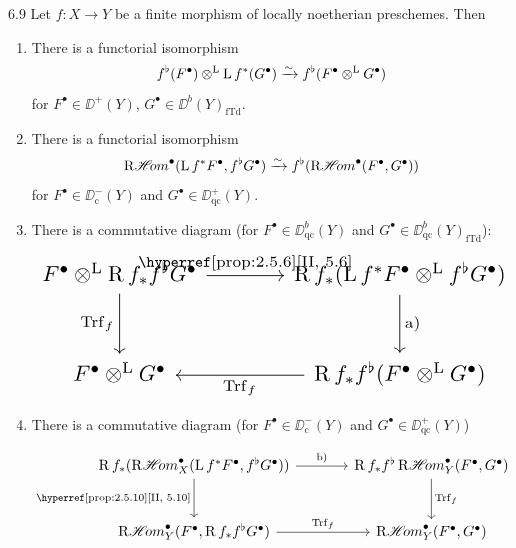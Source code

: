 \begin{bookproposition}{6.9}\label{prop:3.6.9}
Let $f\colon X\to Y$ be a finite morphism of locally noetherian preschemes. Then
\begin{enumerate}
\item[a)] There is a functorial isomorphism
\[
f^{\flat}(F^\bullet)\mathbin{\otimes^{\mathrm{L}}}\operatorname{L} f^*(G^\bullet) \xrightarrow{\sim} f^{\flat}(F^\bullet\mathbin{\otimes^{\mathrm{L}}} G^\bullet)
\]
for $F^\bullet\in\DD^+(Y)$, $G^\bullet\in\DD^b(Y)_{\mathrm{fTd}}$.
\item[b)] There is a functorial isomorphism
\[
\mathop{\mathrm{R}\mathscr{H}\!om}\nolimits^\bullet(\operatorname{L} f^*F^\bullet, f^{\flat}G^\bullet) \xrightarrow{\sim} f^{\flat}(\mathop{\mathrm{R}\mathscr{H}\!om}\nolimits^\bullet(F^\bullet, G^\bullet))
\]
for $F^\bullet\in\DD_{\mathrm{c}}^-(Y)$ and $G^\bullet\in\DD_{\mathrm{qc}}^+(Y)$.
\item[c)] There is a commutative diagram (for $F^\bullet\in\DD_{\mathrm{qc}}^b(Y)$ and $G^\bullet\in\DD_{\mathrm{qc}}^b(Y)_{\mathrm{fTd}}$):
\[
\resizebox{\linewidth}{!}{\begin{tikzcd}[ampersand replacement=\&, row sep=large, column sep=large]
	F^\bullet \derivedtensor \RR f_* f^\flat G^\bullet
	\arrow[r, "{\text{\bookref{prop:2.5.6}{II,~5.6}}}"]
	\arrow[d, "{\operatorname{Trf}_f}"']
	\& \RR f_* (\LL f^* F^\bullet \derivedtensor f^\flat G^\bullet)
	\arrow[d, "\text{a)}"] \\
	F^\bullet \derivedtensor G^\bullet
	\& \RR f_* f^\flat (F^\bullet \derivedtensor G^\bullet)
	\arrow[l, "{\operatorname{Trf}_f}"]
\end{tikzcd}}
\]

\item[d)] There is a commutative diagram (for $F^\bullet\in\DD_{\mathrm{c}}^-(Y)$ and $G^\bullet\in\DD_{\mathrm{qc}}^+(Y)$)

\[
\resizebox{\linewidth}{!}{\begin{tikzcd}[ampersand replacement=\&, row sep=large, column sep=large]
	\RR f_*(\RsheafHom_X^\bullet(\LL f^*F^\bullet, f^\flat G^\bullet))
	\arrow[r, "\text{b)}"]
	\arrow[d, "{\text{\bookref{prop:2.5.10}{II,~5.10}}}"']
	\& \RR f_* f^\flat \RsheafHom_Y^\bullet(F^\bullet, G^\bullet)
	\arrow[d, "{\operatorname{Trf}_f}"] \\
	\RsheafHom_Y^\bullet(F^\bullet, \RR f_* f^\flat G^\bullet)
	\arrow[r, "{\operatorname{Trf}_f}"]
	\& \RsheafHom_Y^\bullet(F^\bullet, G^\bullet)
\end{tikzcd}}
\]
\end{enumerate}
\end{bookproposition}

